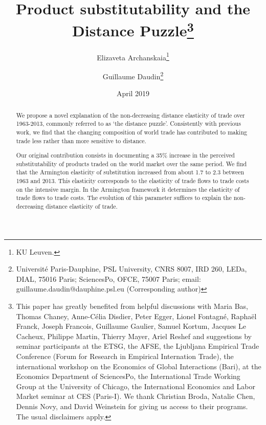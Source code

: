 \documentclass[12pt,twoside,a4paper,notitlepage]{article}
\begin{document}
\linespread{1}
\author{Elizaveta Archanskaia\thanks{KU Leuven.}\and Guillaume Daudin\thanks{Université Paris-Dauphine, PSL University, CNRS 8007, IRD 260, LEDa, DIAL, 75016 Paris; SciencesPo, OFCE, 75007 Paris; email: guillaume.daudin@dauphine.psl.eu (Corresponding author)
}}

\title{Product substitutability and the Distance Puzzle\thanks{This paper has greatly benefited from helpful discussions with Maria Bas, Thomas Chaney, Anne-C\'elia Disdier, Peter Egger, Lionel Fontagn\'e, Raphaël Franck, Joseph Francois, Guillaume Gaulier, Samuel Kortum, Jacques Le Cacheux, Philippe Martin, Thierry Mayer, Ariel Reshef and suggestions by seminar participants at the ETSG, the AFSE, the Ljubljana Empirical Trade Conference (Forum for Research in Empirical Internation Trade), the international workshop on the Economics of Global Interactions (Bari), at the Economics Department of SciencesPo, the International Trade Working Group at the University of Chicago, the International Economics and Labor Market seminar at CES (Paris-I).
We thank Christian Broda, Natalie Chen, Dennis Novy, and David Weinstein for giving us access to their programs.
The usual disclaimers apply.}}
\date{April 2019
\\
}

\maketitle
\begin{abstract}
We propose a novel explanation of the non-decreasing distance elasticity of trade over 1963-2013, commonly referred to as `the distance puzzle'.
Consistently with previous work, we find that the changing composition of world trade has contributed to making trade less rather than more sensitive to distance.

Our original contribution consists in documenting a 35\% increase in the perceived substitutability of products traded on the world market over the same period.
We find that the Armington elasticity of substitution increased from about 1.7 to 2.3 between 1963 and 2013.
This elasticity corresponds to the elasticity of trade flows to trade costs on the intensive margin.
In the Armington framework it determines the elasticity of trade flows to trade costs.
The evolution of this parameter suffices to explain the non-decreasing distance elasticity of trade.

\end{abstract}
\end{document}
